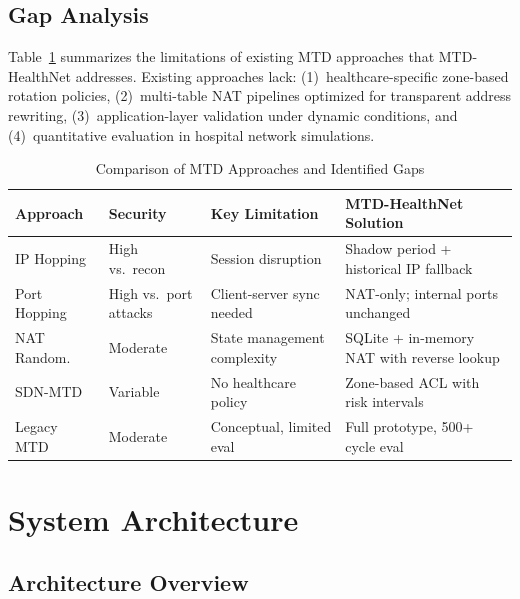 \documentclass[conference]{IEEEtran}
\begin{document}
\subsection{Gap Analysis}

Table~\ref{tab:gap_analysis} summarizes the limitations of existing MTD approaches that MTD-HealthNet addresses. Existing approaches lack: (1)~healthcare-specific zone-based rotation policies, (2)~multi-table NAT pipelines optimized for transparent address rewriting, (3)~application-layer validation under dynamic conditions, and (4)~quantitative evaluation in hospital network simulations.

\begin{table}[htbp]
\caption{Comparison of MTD Approaches and Identified Gaps}
\label{tab:gap_analysis}
\centering
\footnotesize
\begin{tabular}{p{1.4cm}p{1.5cm}p{1.8cm}p{2.0cm}}
\toprule
\textbf{Approach} & \textbf{Security} & \textbf{Key Limitation} & \textbf{MTD-HealthNet Solution} \\
\midrule
IP Hopping~\cite{dishington2019} & High vs.\ recon & Session disruption & Shadow period + historical IP fallback \\
\addlinespace
Port Hopping~\cite{cai2016} & High vs.\ port attacks & Client-server sync needed & NAT-only; internal ports unchanged \\
\addlinespace
NAT Random.~\cite{cai2016} & Moderate & State management complexity & SQLite + in-memory NAT with reverse lookup \\
\addlinespace
SDN-MTD~\cite{lei2018} & Variable & No healthcare policy & Zone-based ACL with risk intervals \\
\addlinespace
Legacy MTD~\cite{huang2021} & Moderate & Conceptual, limited eval & Full prototype, 500+ cycle eval \\
\bottomrule
\end{tabular}
\end{table}

\section{System Architecture}

\subsection{Architecture Overview}
\end{document}
